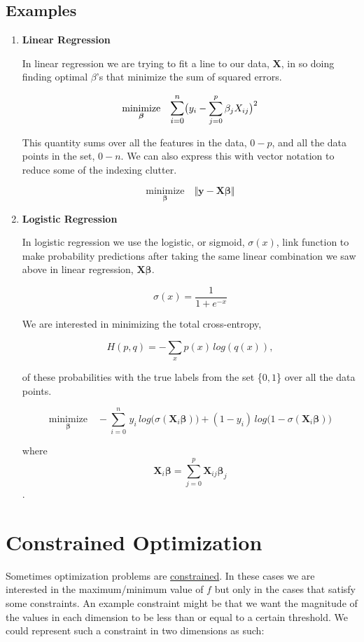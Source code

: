 \documentclass[a4paper, 12pt]{article}
\begin{document}
\subsection*{Examples}
\begin{enumerate}
  \item \textbf{Linear Regression}

In linear regression we are trying to fit a line to our data, $\bm{X}$, in so doing finding optimal $\beta$'s that minimize the sum of squared errors.

    $$ \underset{\bm{\beta}}{\text{minimize}} \quad \mathlarger{\sum_{i=0}^n}
       \big(y_i - \sum_{j=0}^p \beta_j X_{ij} \big)^2 $$

This quantity sums over all the features in the data, $0-p$, and all the data points in the set, $0-n$. We can also express this with vector notation to reduce some of the indexing clutter.

    $$ \underset{\bm{\beta}}{\text{minimize}} \quad \Vert \bm{y} - \bm{X\beta} \Vert $$

  \item \textbf{Logistic Regression}

    In logistic regression we use the logistic, or sigmoid, $\sigma(x)$, link function to make probability predictions after taking the same linear combination we saw above in linear regression, $\bm{X\beta}$.

    $$ \sigma(x) = \frac{1}{1 + e^{-x}} $$

    We are interested in minimizing the total cross-entropy,

    $$ H(p, q) = - \sum_x p(x)\, log(q(x)), $$

    of these probabilities with the true labels from the set \{$0, 1$\} over all the data points.

    $$ \underset{\bm{\beta}}{\text{minimize}} \quad - \sum_{i=0}^n\,
       y_i\, log \big( \sigma(\bm{X}_i \bm{\beta})\big) +
       (1 - y_i)\, log \big( 1 - \sigma(\bm{X}_i \bm{\beta})\big) $$

    \qquad where
    $$ \bm{X}_i \bm{\beta} = \sum_{j=0}^p \bm{X}_{ij} \bm{\beta}_j$$.

\end{enumerate}

\section*{Constrained Optimization}

Sometimes optimization problems are \underline{constrained}. In these cases we are interested in the maximum/minimum value of $f$ but only in the cases that satisfy some constraints. An example constraint might be that we want the magnitude of the values in each dimension to be less than or equal to a certain threshold. We could represent such a constraint in two dimensions as such:
\end{document}
